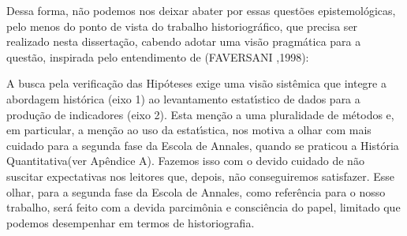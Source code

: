 \documentclass[
12pt,		%
openright,	%
twoside,  %
a4paper,			%
chapter=TITLE,		%
english,			%
french,				%
spanish,			%
brazil				%
]{USPSC-classe/USPSC}
\begin{document}
Dessa forma, n\~ao podemos nos deixar abater por essas quest\~oes epistemol\'ogicas, pelo menos do ponto de vista do trabalho historiogr\'afico, que precisa ser realizado nesta disserta\c{c}\~ao, cabendo adotar uma vis\~ao pragm\'atica para a quest\~ao, inspirada pelo entendimento de (FAVERSANI ,1998):


















\noindent\begin{center}\mbox{\centering{}}\end{center}


A busca pela verifica\c{c}\~ao das Hip\'oteses exige uma vis\~ao sist\^emica que integre a abordagem hist\'orica (eixo 1) ao levantamento estat\'{\i}stico de dados para a produ\c{c}\~ao de indicadores (eixo 2). Esta men\c{c}\~ao a uma pluralidade de m\'etodos e, em particular, a men\c{c}\~ao ao uso da estat\'{\i}stica, nos motiva a olhar com mais cuidado para a segunda fase da Escola de Annales, quando se praticou a \textquotedbl Hist\'oria Quantitativa\textquotedbl  (ver Ap\^endice A). Fazemos isso com o devido cuidado de n\~ao suscitar expectativas nos leitores que, depois, n\~ao conseguiremos satisfazer. Esse olhar, para a segunda fase da Escola de Annales, como refer\^encia para o nosso trabalho, ser\'a feito com a devida parcim\^onia e consci\^encia do papel, limitado que podemos desempenhar em termos de historiografia.
\end{document}
